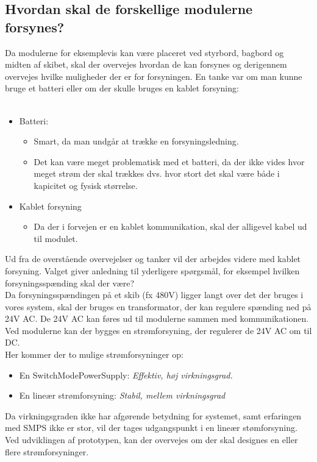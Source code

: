 \subsection{Hvordan skal de forskellige modulerne forsynes?}
Da modulerne for eksemplevis kan være placeret ved styrbord, bagbord og midten af skibet, skal der overvejes hvordan de kan forsynes og derigennem overvejes hvilke muligheder der er for forsyningen.
En tanke var om man kunne bruge et batteri eller om der skulle bruges en kablet forsyning:\\\\
\begin{itemize}
\item Batteri:
	\begin{itemize}
	\item Smart, da man undgår at trække en forsyningsledning.
	\item Det kan være meget problematisk med et batteri, da der ikke vides hvor meget strøm der skal trækkes dvs. hvor stort det skal være både i kapicitet og fysisk størrelse. \\
	\end{itemize}
\item Kablet forsyning \\
\begin{itemize}
\item Da der i forvejen er en kablet kommunikation, skal der alligevel kabel ud til modulet.\\
\end{itemize}
\end{itemize}
Ud fra de overstående overvejelser og tanker vil der arbejdes videre med kablet forsyning.
Valget giver anledning til yderligere spørgsmål, for eksempel hvilken forsyningsspænding skal der være?\\
Da forsyningsspændingen på et skib (fx 480V) ligger langt over det der bruges i vores system, skal der bruges en transformator, der kan regulere spænding ned på 24V AC. De 24V AC kan føres ud til modulerne sammen med kommunikationen. \\
Ved modulerne kan der bygges en strømforsyning, der regulerer de 24V AC om til DC. \\
Her kommer der to mulige strømforsyninger op:
\begin{itemize}
\item En SwitchModePowerSupply: \textit{Effektiv, høj virkningsgrad.}
\item En lineær strømforsyning: \textit{Stabil, mellem virkningsgrad}
\end{itemize}
Da virkningsgraden ikke har afgørende betydning for systemet, samt erfaringen med SMPS ikke er stor, vil der tages udgangspunkt i en lineær stømforsyning.\\
Ved udviklingen af prototypen, kan der overvejes om der skal designes en eller flere strømforsyninger.


